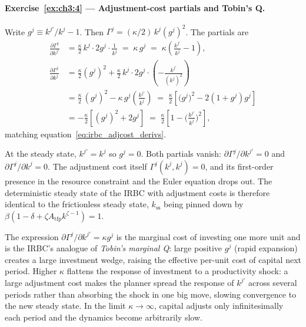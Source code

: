 \documentclass[11pt,a4paper]{report}
\begin{document}
\paragraph{Exercise~\ref{ex:ch3:4} --- Adjustment-cost partials and Tobin's Q.}
Write $g^j \equiv k^{j\prime}/k^j - 1$.  Then $\Gamma^j = (\kappa/2)\,k^j (g^j)^2$.  The partials are
\begin{align*}
\frac{\partial \Gamma^j}{\partial k^{j\prime}} &= \frac{\kappa}{2}\,k^j \cdot 2 g^j \cdot \frac{1}{k^j} \;=\; \kappa\,g^j \;=\; \kappa\!\left(\frac{k^{j\prime}}{k^j} - 1\right), \\
\frac{\partial \Gamma^j}{\partial k^j} &= \frac{\kappa}{2}(g^j)^2 + \frac{\kappa}{2}\,k^j \cdot 2 g^j \cdot \!\left(-\frac{k^{j\prime}}{(k^j)^2}\right) \\
&= \frac{\kappa}{2}\,(g^j)^2 - \kappa\,g^j\!\left(\frac{k^{j\prime}}{k^j}\right)
   \;=\; \frac{\kappa}{2}\!\left[\bigl(g^j\bigr)^2 - 2(1+g^j) g^j\right] \\
&= -\frac{\kappa}{2}\!\left[(g^j)^2 + 2 g^j\right] \;=\; \frac{\kappa}{2}\!\left[1 - \bigl(\tfrac{k^{j\prime}}{k^j}\bigr)^{\!2}\right],
\end{align*}
matching equation~\eqref{eq:irbc_adjcost_derivs}.

At the steady state, $k^{j\prime} = k^j$ so $g^j = 0$.  Both partials vanish: $\partial\Gamma^j/\partial k^{j\prime} = 0$ and $\partial\Gamma^j/\partial k^j = 0$.  The adjustment cost itself $\Gamma^j(k^j, k^j) = 0$, and its first-order presence in the resource constraint and the Euler equation drops out.  The deterministic steady state of the IRBC with adjustment costs is therefore identical to the frictionless steady state, $k_\mathrm{ss}$ being pinned down by $\beta(1 - \delta + \zeta A_\mathrm{tfp} k^{\zeta-1}) = 1$.

The expression $\partial\Gamma^j/\partial k^{j\prime} = \kappa g^j$ is the marginal cost of investing one more unit and is the IRBC's analogue of \emph{Tobin's marginal Q}: large positive $g^j$ (rapid expansion) creates a large investment wedge, raising the effective per-unit cost of capital next period.  Higher $\kappa$ flattens the response of investment to a productivity shock: a large adjustment cost makes the planner spread the response of $k^{j\prime}$ across several periods rather than absorbing the shock in one big move, slowing convergence to the new steady state.  In the limit $\kappa \to \infty$, capital adjusts only infinitesimally each period and the dynamics become arbitrarily slow.
\end{document}
